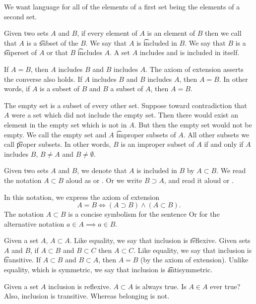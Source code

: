 

We want language for all of the elements of a first set being the elements of a second set.


Given two sets $A$ and $B$, if every element of $A$ is an element of $B$ then we call that $A$ is a \t{subset} of the $B$.
We say that $A$ is \t{included} in $B$.
We say that $B$ is a \t{superset} of $A$ or that $B$ \t{includes} $A$.
A set $A$ includes and is included in itself.

If $A = B$, then $A$ includes $B$ and $B$ includes $A$.
The axiom of extension asserts the converse also holds.
If $A$ includes $B$ and $B$ includes $A$, then $A = B$.
In other words, if $A$ is a subset of $B$ and $B$ a subset of $A$, then $A = B$.

The empty set is a subset of every other set.
Suppose toward contradiction that $A$ were a set which did not include the empty set.
Then there would exist an element in the empty set which is not in $A$.
But then the empty set would not be empty.
We call the empty set and $A$ \t{improper subsets} of $A$.
All other subsets we call \t{proper subsets}.
In other words, $B$ is an improper subset of $A$ if and only if $A$ includes $B$, $B \neq A$ and $B \neq \emptyset$.

Given two sets $A$ and $B$, we denote that $A$ is included in $B$ by $A \subset B$.
We read the notation $A \subset B$ aloud as  or .
Or we write $B \supset A$, and read it aloud  or .

In this notation, we express the axiom of extension
\[
  A = B \Leftrightarrow (A \supset B) \land (A \subset B).
\]
The notation $A \subset B$
is a concise symbolism for
the sentence
 Or for the alternative notation
$a \in A \implies a \in B$.


Given a set $A$, $A \subset A$.
Like equality, we say that inclusion is \t{reflexive}.
Given sets $A$ and $B$, if $A \subset B$ and $B \subset C$ then $A \subset C$.
Like equality, we say that inclusion is \t{transitive}.
If $A \subset B$ and $B \subset A$, then $A = B$ (by the axiom of extension).
Unlike equality, which is symmetric, we say that inclusion is \t{antisymmetric}.


Given a set $A$ inclusion is reflexive.
$A \subset A$ is always true.
Is $A \in A$ ever true?
Also, inclusion is transitive.
Whereas belonging is not.
